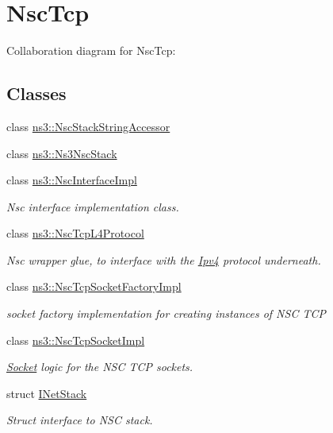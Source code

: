 \hypertarget{group__nsctcp}{}\section{Nsc\+Tcp}
\label{group__nsctcp}
Collaboration diagram for Nsc\+Tcp\+:
\subsection*{Classes}
\begin{DoxyCompactItemize}
\item 
class \hyperlink{classns3_1_1NscStackStringAccessor}{ns3\+::\+Nsc\+Stack\+String\+Accessor}
\item 
class \hyperlink{classns3_1_1Ns3NscStack}{ns3\+::\+Ns3\+Nsc\+Stack}
\item 
class \hyperlink{classns3_1_1NscInterfaceImpl}{ns3\+::\+Nsc\+Interface\+Impl}
\begin{DoxyCompactList}\small\item\em Nsc interface implementation class. \end{DoxyCompactList}\item 
class \hyperlink{classns3_1_1NscTcpL4Protocol}{ns3\+::\+Nsc\+Tcp\+L4\+Protocol}
\begin{DoxyCompactList}\small\item\em Nsc wrapper glue, to interface with the \hyperlink{classns3_1_1Ipv4}{Ipv4} protocol underneath. \end{DoxyCompactList}\item 
class \hyperlink{classns3_1_1NscTcpSocketFactoryImpl}{ns3\+::\+Nsc\+Tcp\+Socket\+Factory\+Impl}
\begin{DoxyCompactList}\small\item\em socket factory implementation for creating instances of N\+SC T\+CP \end{DoxyCompactList}\item 
class \hyperlink{classns3_1_1NscTcpSocketImpl}{ns3\+::\+Nsc\+Tcp\+Socket\+Impl}
\begin{DoxyCompactList}\small\item\em \hyperlink{classns3_1_1Socket}{Socket} logic for the N\+SC T\+CP sockets. \end{DoxyCompactList}\item 
struct \hyperlink{structINetStack}{I\+Net\+Stack}
\begin{DoxyCompactList}\small\item\em Struct interface to N\+SC stack. \end{DoxyCompactList}\item 

\end{DoxyCompactItemize}
